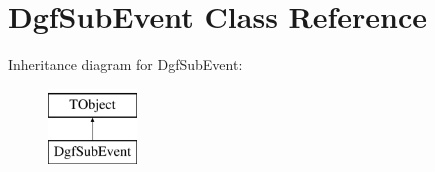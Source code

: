 \hypertarget{class_dgf_sub_event}{}\section{Dgf\+Sub\+Event Class Reference}
\label{class_dgf_sub_event}
Inheritance diagram for Dgf\+Sub\+Event\+:\begin{figure}[H]
\begin{center}
\leavevmode
\includegraphics[height=2.000000cm]{class_dgf_sub_event}
\end{center}
\end{figure}
